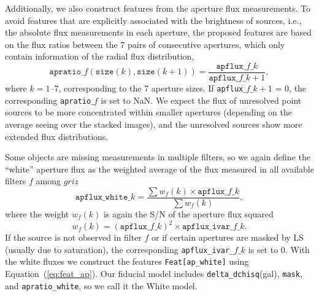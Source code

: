 \documentclass[twocolumn]{aastex631}
\begin{document}
\begin{CJK*}{UTF8}{gbsn}
Additionally, we also construct features from the aperture flux measurements. To avoid features that are explicitly associated with the brightness of sources, i.e., the absolute flux measurements in each aperture, the proposed features are based on the flux ratios between the 7 pairs of consecutive apertures, which only contain information of the radial flux distribution,
\begin{equation}\label{eq:feat_ap}
    \texttt{apratio\_}f(\texttt{size}(k), \texttt{size}(k+1)) = \frac{\texttt{apflux\_}f\texttt{\_}k}{\texttt{apflux\_}f\texttt{\_}k+1},
\end{equation}
where $k=1$--7, corresponding to the 7 aperture sizes. 
If \texttt{apflux}$\_f\_k+1$ = 0, the corresponding \texttt{apratio}$\_f$ is set to NaN. We expect the flux of unresolved point sources to be more concentrated within smaller apertures (depending on the average seeing over the stacked images), and the unresolved sources show more extended flux distributions.

Some objects are missing measurements in multiple filters, so we again define the ``white'' aperture flux as the weighted average of the flux measured in all available filters $f$ among $griz$
\begin{equation}\label{eq:apflux_white}
    \texttt{apflux\_white\_}k = \frac{\sum w_f(k) \times \texttt{apflux\_}f\_k}{\sum w_f(k)},
\end{equation}
where the weight $w_f(k)$ is again the S/N of the aperture flux squared 
\begin{equation*}
    w_f(k) = (\texttt{apflux\_}f\_k)^2\times \texttt{apflux\_ivar\_}f\_k.
\end{equation*} 
If the source is not observed in filter $f$ or if certain apertures are masked by LS (usually due to saturation), the corresponding \texttt{apflux\_ivar\_}$f\_k$ is set to 0. With the white fluxes we construct the features \texttt{Feat[ap\_white]} using Equation~(\ref{eq:feat_ap}).
Our fiducial model includes \texttt{delta\_dchisq}(gal), \texttt{mask}, and \texttt{apratio\_white}, so we call it the White model. 


\end{CJK*}
\end{document}
